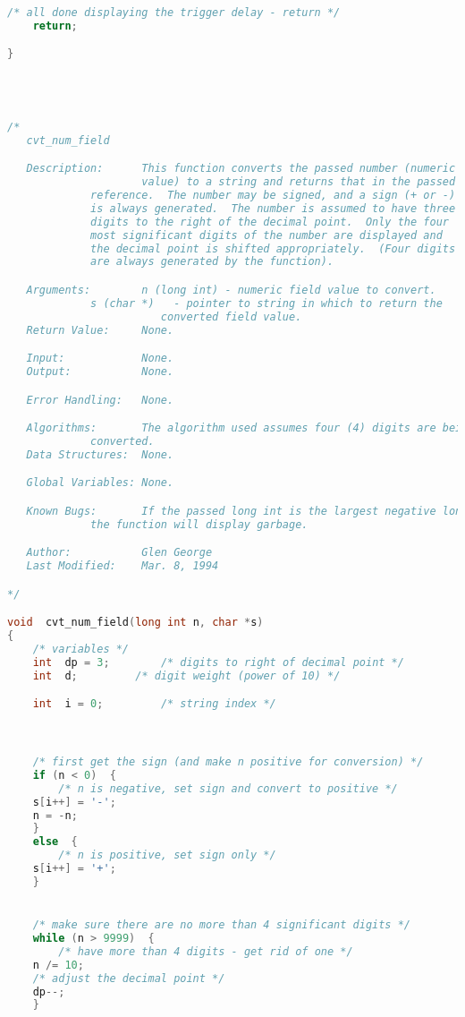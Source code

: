 \begin{lstlisting}[language=C]
    /* all done displaying the trigger delay - return */
    return;

}




/*
   cvt_num_field

   Description:      This function converts the passed number (numeric field
                     value) to a string and returns that in the passed string
		     reference.  The number may be signed, and a sign (+ or -)
		     is always generated.  The number is assumed to have three
		     digits to the right of the decimal point.  Only the four
		     most significant digits of the number are displayed and
		     the decimal point is shifted appropriately.  (Four digits
		     are always generated by the function).

   Arguments:        n (long int) - numeric field value to convert.
   		     s (char *)   - pointer to string in which to return the
		     		    converted field value.
   Return Value:     None.

   Input:            None.
   Output:           None.

   Error Handling:   None.

   Algorithms:       The algorithm used assumes four (4) digits are being
   		     converted.
   Data Structures:  None.

   Global Variables: None.

   Known Bugs:       If the passed long int is the largest negative long int,
   		     the function will display garbage.

   Author:           Glen George
   Last Modified:    Mar. 8, 1994

*/

void  cvt_num_field(long int n, char *s)
{
    /* variables */
    int  dp = 3;		/* digits to right of decimal point */
    int  d;			/* digit weight (power of 10) */

    int  i = 0;			/* string index */



    /* first get the sign (and make n positive for conversion) */
    if (n < 0)  {
        /* n is negative, set sign and convert to positive */
	s[i++] = '-';
	n = -n;
    }
    else  {
        /* n is positive, set sign only */
	s[i++] = '+';
    }


    /* make sure there are no more than 4 significant digits */
    while (n > 9999)  {
        /* have more than 4 digits - get rid of one */
	n /= 10;
	/* adjust the decimal point */
	dp--;
    }


\end{lstlisting}
